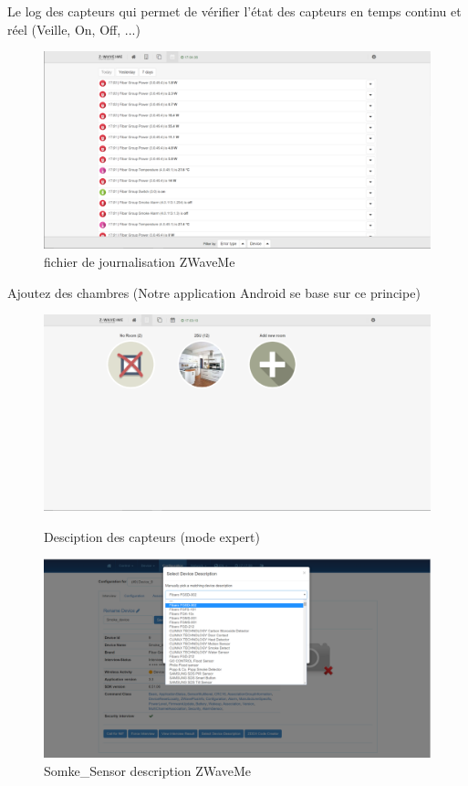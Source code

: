 \begin{itemize}
\item Le log des capteurs qui permet de vérifier l'état des capteurs en temps continu et réel (Veille, On, Off, ...)


\begin{figure}[h]
	\center
\includegraphics[scale=0.5]{./Images/png/log_zwaveme.png}
	\caption{fichier de journalisation ZWaveMe}
\end{figure}

\item Ajoutez des chambres (Notre application Android se base sur ce principe)

\begin{figure}[h]
	\center
\includegraphics[scale=0.5]{./Images/png/room_zwaveme.png}\newline

\item Desciption des capteurs (mode expert)

\includegraphics[scale=0.5]{./Images/png/smoke_description_zwaveme.png}
	\caption{Somke\_Sensor description ZWaveMe}


\end{figure}
\end{itemize}
